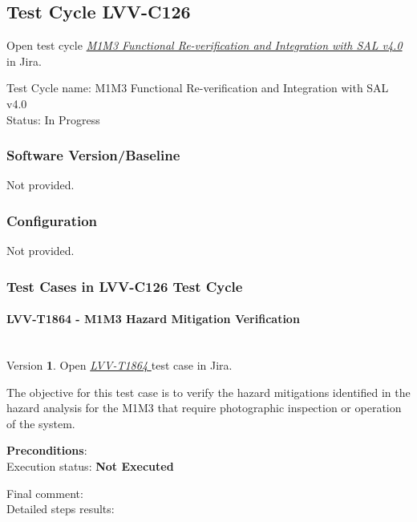 \documentclass[SE,lsstdraft,STR,toc]{lsstdoc}
\begin{document}
\subsection{Test Cycle LVV-C126 }

Open test cycle {\it \href{https://jira.lsstcorp.org/secure/Tests.jspa#/testrun/LVV-C126}{M1M3 Functional Re-verification and Integration with SAL v4.0}} in Jira.

Test Cycle name: M1M3 Functional Re-verification and Integration with SAL v4.0\\
Status: In Progress



\subsubsection{Software Version/Baseline}
Not provided.

\subsubsection{Configuration}
Not provided.

\subsubsection{Test Cases in LVV-C126 Test Cycle}

\paragraph{ LVV-T1864 - M1M3 Hazard Mitigation Verification }\mbox{}\\

Version \textbf{1}.
Open  \href{https://jira.lsstcorp.org/secure/Tests.jspa#/testCase/LVV-T1864}{\textit{ LVV-T1864 } }
test case in Jira.

The objective for this test case is to verify the hazard mitigations
identified in the hazard analysis for the M1M3 that require photographic
inspection or operation of the system.

\textbf{ Preconditions}:\\


Execution status: {\bf Not Executed }

Final comment:\\


Detailed steps results:
\end{document}
